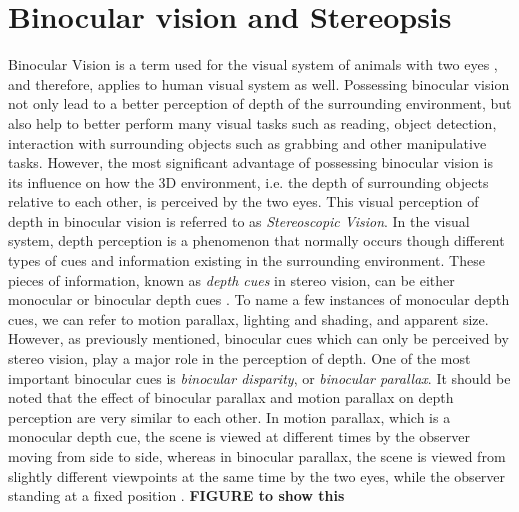 \documentclass[12pt]{report}
\begin{document}
\chapter{Binocular vision and Stereopsis}
Binocular Vision is a term used for the visual system of animals with two eyes \cite{how95}, and therefore, applies to human visual system as well. 
Possessing binocular vision not only lead to a better perception of depth
of the surrounding environment, but also help to better perform many visual tasks such as reading, object detection, interaction with surrounding objects such as grabbing and other manipulative 
tasks. However, the most significant advantage of possessing binocular vision is its influence on how the 3D environment, i.e. the depth of surrounding objects relative to each other, 
is perceived by the two eyes. This visual perception of depth in binocular vision is referred to as {\it Stereoscopic Vision}.
In the visual system, depth perception is a phenomenon that normally occurs though different types of cues and information existing in the surrounding environment. 
These pieces of information, known as {\it depth cues} in stereo vision, can be either monocular or binocular depth cues \cite{how95}.
To name a few instances of monocular depth cues, we can refer to motion parallax, lighting and shading, and apparent size. 
However, as previously mentioned, binocular cues which can only be perceived
by stereo vision, play a major role in the perception of depth. One of the most important binocular cues is {\it binocular disparity}, or {\it binocular parallax}. 
It should be noted that the effect of binocular parallax and motion parallax on depth perception are very similar to each other. 
In motion parallax, which is a monocular depth cue, the scene is viewed at different times by the observer moving from side to side, 
whereas in binocular parallax, the scene is viewed from slightly different viewpoints at
the same time by the two eyes, while the observer standing at a fixed position \cite{how95}. \textbf{FIGURE to show this}
\end{document}
